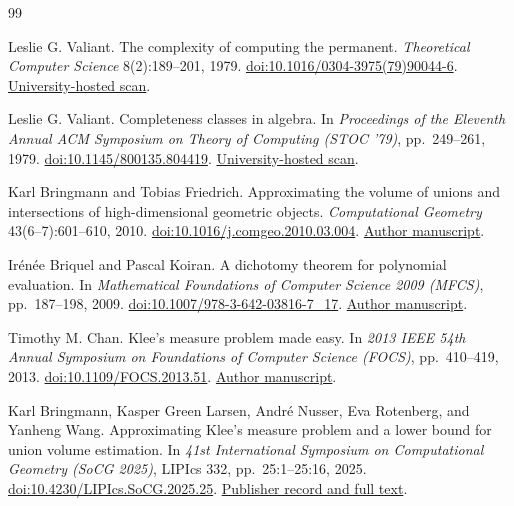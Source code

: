 \documentclass[12pt,a4paper]{article}
\theoremstyle{definition}
\theoremstyle{remark}
\begin{document}
\clearpage
\begin{thebibliography}{99}

Leslie G. Valiant.
The complexity of computing the permanent.
\emph{Theoretical Computer Science} 8(2):189--201, 1979.
\href{https://doi.org/10.1016/0304-3975(79)90044-6}{doi:10.1016/0304-3975(79)90044-6}.
\href{https://sites.math.washington.edu/~billey/colombia/references/valiant.permanent.1979pdf.pdf}{University-hosted scan}.

Leslie G. Valiant.
Completeness classes in algebra.
In \emph{Proceedings of the Eleventh Annual ACM Symposium on Theory of
Computing (STOC '79)}, pp.~249--261, 1979.
\href{https://doi.org/10.1145/800135.804419}{doi:10.1145/800135.804419}.
\href{https://sites.math.washington.edu/~billey/colombia/references/valiant.completeness.1979.pdf}{University-hosted scan}.

Karl Bringmann and Tobias Friedrich.
Approximating the volume of unions and intersections of high-dimensional
geometric objects.
\emph{Computational Geometry} 43(6--7):601--610, 2010.
\href{https://doi.org/10.1016/j.comgeo.2010.03.004}{doi:10.1016/j.comgeo.2010.03.004}.
\href{https://people.mpi-inf.mpg.de/~kbringma/paper/J2010CGTA.pdf}{Author manuscript}.

Ir\'en\'ee Briquel and Pascal Koiran.
A dichotomy theorem for polynomial evaluation.
In \emph{Mathematical Foundations of Computer Science 2009 (MFCS)},
pp.~187--198, 2009.
\href{https://doi.org/10.1007/978-3-642-03816-7_17}{doi:10.1007/978-3-642-03816-7\_17}.
\href{https://perso.ens-lyon.fr/pascal.koiran/Publis/mfcs09.dichotomy_theorem.pdf}{Author manuscript}.

Timothy M. Chan.
Klee's measure problem made easy.
In \emph{2013 IEEE 54th Annual Symposium on Foundations of Computer
Science (FOCS)}, pp.~410--419, 2013.
\href{https://doi.org/10.1109/FOCS.2013.51}{doi:10.1109/FOCS.2013.51}.
\href{https://tmc.web.engr.illinois.edu/easyklee8_13.pdf}{Author manuscript}.

Karl Bringmann, Kasper Green Larsen, Andr\'e Nusser, Eva Rotenberg,
and Yanheng Wang.
Approximating Klee's measure problem and a lower bound for union volume
estimation.
In \emph{41st International Symposium on Computational Geometry
(SoCG 2025)}, LIPIcs 332, pp.~25:1--25:16, 2025.
\href{https://doi.org/10.4230/LIPIcs.SoCG.2025.25}{doi:10.4230/LIPIcs.SoCG.2025.25}.
\href{https://drops.dagstuhl.de/entities/document/10.4230/LIPIcs.SoCG.2025.25}{Publisher record and full text}.


\end{thebibliography}
\end{document}
